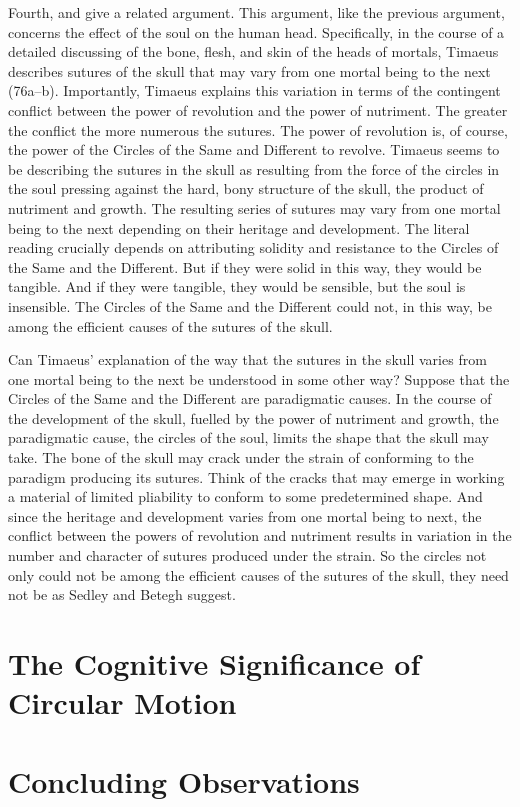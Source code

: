 Fourth, \citet[330]{Sedley:1997kr} and \citet[132]{Betegh:2019fq} give a related argument. This argument, like the previous argument, concerns the effect of the soul on the human head. Specifically, in the course of a detailed discussing of the bone, flesh, and skin of the heads of mortals, Timaeus describes sutures of the skull that may vary from one mortal being to the next (76a--b). Importantly, Timaeus explains this variation in terms of the contingent conflict between the power of revolution and the power of nutriment. The greater the conflict the more numerous the sutures. The power of revolution is, of course, the power of the Circles of the Same and Different to revolve. Timaeus seems to be describing the sutures in the skull as resulting from the force of the circles in the soul pressing against the hard, bony structure of the skull, the product of nutriment and growth. The resulting series of sutures may vary from one mortal being to the next depending on their heritage and development. The literal reading crucially depends on attributing solidity and resistance to the Circles of the Same and the Different. But if they were solid in this way, they would be tangible. And if they were tangible, they would be sensible, but the soul is insensible. The Circles of the Same and the Different could not, in this way, be among the efficient causes of the sutures of the skull.

Can Timaeus' explanation of the way that the sutures in the skull varies from one mortal being to the next be understood in some other way? Suppose that the Circles of the Same and the Different are paradigmatic causes. In the course of the development of the skull, fuelled by the power of nutriment and growth, the paradigmatic cause, the circles of the soul, limits the shape that the skull may take. The bone of the skull may crack under the strain of conforming to the paradigm producing its sutures. Think of the cracks that may emerge in working a material of limited pliability to conform to some predetermined shape. And since the heritage and development varies from one mortal being to next, the conflict between the powers of revolution and nutriment results in variation in the number and character of sutures produced under the strain. So the circles not only could not be among the efficient causes of the sutures of the skull, they need not be as Sedley and Betegh suggest.


\section{The Cognitive Significance of Circular Motion} %
\label{sec:the_cognitive_significance_of_circular_motion}




\section{Concluding Observations} %
\label{sec:concluding_observations_p}




